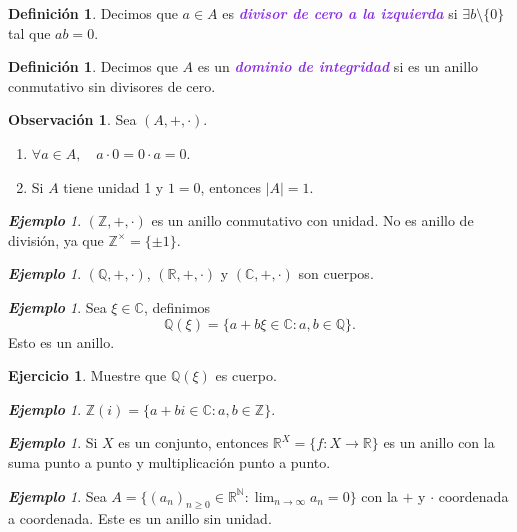 \documentclass{article}
\theoremstyle{definition}
\newtheorem{definition}[theorem]{Definición}
\newtheorem{exercise}{Ejercicio}
\newtheorem*{obs}{Observación}
\theoremstyle{remark}
\newtheorem{example}[theorem]{\textbf{Ejemplo}}
\numberwithin{equation}{section}
\newcommand{\C}{\mathbb{C}}
\newcommand{\N}{\mathbb{N}}
\newcommand{\Q}{\mathbb{Q}}
\newcommand{\R}{\mathbb{R}}
\newcommand{\Z}{\mathbb{Z}}
\newcommand{\oo}{\infty}
\renewcommand{\c}{\cdot}
\newcommand{\abs}[1]{\left| #1 \right|}
\newcommand{\ds}{\displaystyle}
\newcommand{\wea}[1]{\textcolor{BlueViolet}{\textbf{\emph{#1}}}}
\begin{document}
\begin{definition}
  Decimos que $a \in A$ es \wea{divisor de cero a la izquierda} si $\exists b \setminus \{0\}$ tal que $ab = 0$.
\end{definition}

\begin{definition}
  Decimos que $A$ es un \wea{dominio de integridad} si es un anillo conmutativo sin divisores de cero.
\end{definition}

\begin{obs}
  Sea $(A,+,\c)$. \begin{enumerate}
    \item $\forall a \in A, \quad a \c 0 = 0 \c a = 0$.
    \item Si $A$ tiene unidad 1 y $1=0$, entonces $\abs A = 1$.
  \end{enumerate}
\end{obs}

\begin{example}
  $(\Z,+,\c)$ es un anillo conmutativo con unidad. No es anillo de división, ya que $\Z^\times = \{\pm 1\}$.
\end{example}

\begin{example}
  $(\Q,+,\c)$, $(\R,+,\c)$ y $(\C,+,\c)$ son cuerpos.
\end{example}

\begin{example}
  Sea $\xi \in \C$, definimos 
  \[ \Q(\xi) = \{a + b \xi \in \C \colon a,b \in \Q\}. \]
  Esto es un anillo.
\end{example}

\begin{exercise}
  Muestre que $\Q(\xi)$ es cuerpo.
\end{exercise}

\begin{example}
  $\Z(i) = \{a+bi \in \C \colon a,b \in \Z\}$.
\end{example}

\begin{example}
  Si $X$ es un conjunto, entonces $\R^X = \{f \colon X \to \R\}$ es un anillo con la suma punto a punto y multiplicación punto a punto.
\end{example}

\begin{example}
  Sea $\ds A = \{(a_n)_{n \geq 0} \in \R^\N \colon \lim_{n\to\oo} a_n = 0\}$ con la $+$ y $\c$ coordenada a coordenada. Este es un anillo sin unidad.
\end{example}
\end{document}
